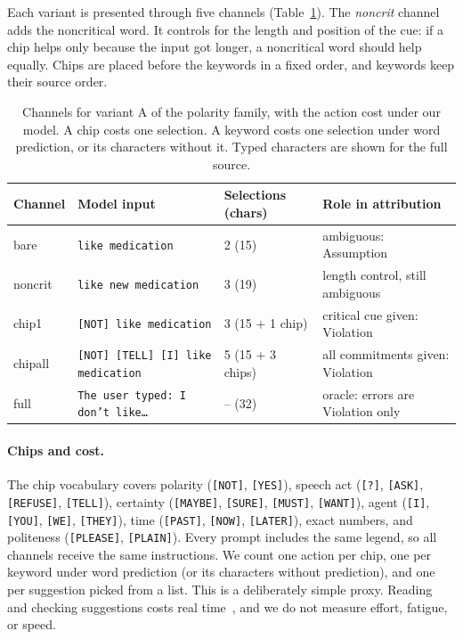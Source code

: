 \documentclass{ceurart}
\newcommand{\chip}[1]{\texttt{[#1]}}
\newcommand{\kw}[1]{\texttt{#1}}
\begin{document}
Each variant is presented through five channels (Table~\ref{tab:channels}).
The \emph{noncrit} channel adds the noncritical word.
It controls for the length and position of the cue: if a chip helps only because the input got longer, a noncritical word should help equally.
Chips are placed before the keywords in a fixed order, and keywords keep their source order.

\begin{table}[t]
  \caption{Channels for variant A of the polarity family, with the action cost under our model. A chip costs one selection. A keyword costs one selection under word prediction, or its characters without it. Typed characters are shown for the full source.}
  \label{tab:channels}
  \small
  \begin{tabular}{@{}lllp{4.7cm}@{}}
    \toprule
    Channel & Model input & Selections (chars) & Role in attribution\\
    \midrule
    bare & \kw{like medication} & 2 (15) & ambiguous: Assumption\\
    noncrit & \kw{like new medication} & 3 (19) & length control, still ambiguous\\
    chip1 & \kw{[NOT] like medication} & 3 (15 + 1 chip) & critical cue given: Violation\\
    chipall & \kw{[NOT] [TELL] [I] like medication} & 5 (15 + 3 chips) & all commitments given: Violation\\
    full & \kw{The user typed: I don't like\ldots} & -- (32) & oracle: errors are Violation only\\
    \bottomrule
  \end{tabular}
\end{table}

\paragraph{Chips and cost.}
The chip vocabulary covers polarity (\chip{NOT}, \chip{YES}), speech act (\chip{?}, \chip{ASK}, \chip{REFUSE}, \chip{TELL}), certainty (\chip{MAYBE}, \chip{SURE}, \chip{MUST}, \chip{WANT}), agent (\chip{I}, \chip{YOU}, \chip{WE}, \chip{THEY}), time (\chip{PAST}, \chip{NOW}, \chip{LATER}), exact numbers, and politeness (\chip{PLEASE}, \chip{PLAIN}).
Every prompt includes the same legend, so all channels receive the same instructions.
We count one action per chip, one per keyword under word prediction (or its characters without prediction), and one per suggestion picked from a list.
This is a deliberately simple proxy.
Reading and checking suggestions costs real time~\cite{cai2024speakfaster,waller2025typetalk}, and we do not measure effort, fatigue, or speed.
\end{document}
